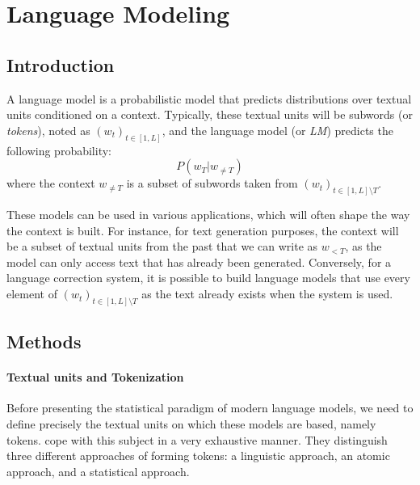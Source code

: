 \section{Language Modeling}


\subsection{Introduction}
A language model is a probabilistic model that predicts distributions over textual units conditioned on a context. Typically, these textual units will be subwords (or \textit{tokens}), noted as $(w_t)_{t\in[1, L]}$, and the language model (or \textit{LM}) predicts the following probability:
$$
P(w_T | w_{\neq T})
$$
where the context $w_{\neq T}$ is a subset of subwords taken from $(w_t)_{t\in[1, L] \setminus T}$.

These models can be used in various applications, which will often shape the way the context is built. For instance, for text generation purposes, the context will be a subset of textual units from the past that we can write as $w_{< T}$, as the model can only access text that has already been generated. Conversely, for a language correction system, it is possible to build language models that use every element of $(w_t)_{t\in[1, L] \setminus T}$ as the text already exists when the system is used.


\subsection{Methods}

\paragraph*{Textual units and Tokenization} Before presenting the statistical paradigm of modern language models, we need to define precisely the textual units on which these models are based, namely tokens. \citet{mielke2021wordscharactersbriefhistory} cope with this subject in a very exhaustive manner. They distinguish three different approaches of forming tokens: a linguistic approach, an atomic approach, and a statistical approach.

